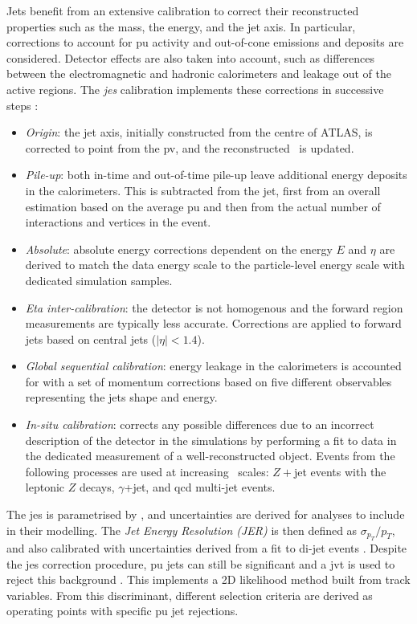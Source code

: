 Jets benefit from an extensive calibration to correct their reconstructed properties such as the mass, the energy, and the jet axis. In particular, corrections to account for \gls{pu} activity and out-of-cone emissions and deposits are considered. Detector effects are also taken into account, such as differences between the electromagnetic and hadronic calorimeters and leakage out of the active regions. The \textit{\gls{jes}} calibration implements these corrections in successive steps \cite{ATLASjesjerMeas}: 
\begin{itemize}[leftmargin=*]
\item \textit{Origin}: the jet axis, initially constructed from the centre of ATLAS, is corrected to point from the \gls{pv}, and the reconstructed \pt\ is updated.
\item \textit{Pile-up}: both in-time and out-of-time pile-up leave additional energy deposits in the calorimeters. This is subtracted from the jet, first from an overall estimation based on the average \gls{pu} and then from the actual number of interactions and vertices in the event. 
\item \textit{Absolute}: absolute energy corrections dependent on the energy $E$ and $\eta$ are derived to match the data energy scale to the particle-level energy scale with dedicated simulation samples.
\item \textit{Eta inter-calibration}: the detector is not homogenous and the forward region measurements are typically less accurate. Corrections are applied to forward jets based on central jets ($|\eta|<1.4$).
\item \textit{Global sequential calibration}: energy leakage in the calorimeters is accounted for with a set of momentum corrections based on five different observables representing the jets shape and energy.  
\item \textit{In-situ calibration}: corrects any possible differences due to an incorrect description of the detector in the simulations by performing a fit to data in the dedicated measurement of a well-reconstructed object. Events from the following processes are used at increasing \pt\ scales: $Z+$jet events with the leptonic $Z$ decays, $\gamma$+jet, and \gls{qcd} multi-jet events.
\end{itemize}
The \gls{jes} is parametrised by \pt, and uncertainties are derived for analyses to include in their modelling. The \textit{Jet Energy Resolution (JER)} is then defined as $\sigma_{p_T}/p_T$, and also calibrated with uncertainties derived from a fit to di-jet events \cite{ATLASjesjerMeas}. Despite the \gls{jes} correction procedure, \gls{pu} jets can still be significant and a \gls{jvt} is used to reject this background \cite{ATLAS-CONF-2014-018}. This implements a 2D likelihood method built from track variables. From this discriminant, different selection criteria are derived as operating points with specific \gls{pu} jet rejections. 

